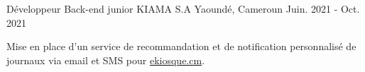 \begin{cventries}
  \cventry
    {Développeur Back-end junior} %
    {KIAMA S.A} %
    {Yaoundé, Cameroun} %
    {Juin. 2021 - Oct. 2021} %
    {
      \begin{cvitems} %
        \item {Mise en place d'un service de recommandation et de notification personnalisé de journaux via email et SMS pour \href{https://ekiosque.cm/}{ekiosque.cm}}.
      \end{cvitems}
    }

\end{cventries}
